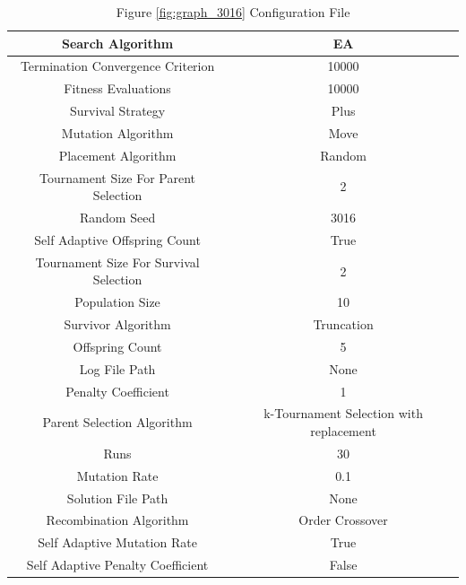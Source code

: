 \documentclass{standalone}
\begin{document}
\begin{table}[!htb]
	\centering
	\caption{Figure \ref{fig:graph_3016} Configuration File}
	\label{tab:graph_3016}
	\begin{tabular}{| c | c |}
		\hline
		Search Algorithm		& EA		 \\
		\hline
		Termination Convergence Criterion		& 10000		 \\
		\hline
		Fitness Evaluations		& 10000		 \\
		\hline
		Survival Strategy		& Plus		 \\
		\hline
		Mutation Algorithm		& Move		 \\
		\hline
		Placement Algorithm		& Random		 \\
		\hline
		Tournament Size For Parent Selection		& 2		 \\
		\hline
		Random Seed		& 3016		 \\
		\hline
		Self Adaptive Offspring Count		& True		 \\
		\hline
		Tournament Size For Survival Selection		& 2		 \\
		\hline
		Population Size		& 10		 \\
		\hline
		Survivor Algorithm		& Truncation		 \\
		\hline
		Offspring Count		& 5		 \\
		\hline
		Log File Path		& None		 \\
		\hline
		Penalty Coefficient		& 1		 \\
		\hline
		Parent Selection Algorithm		& k-Tournament Selection with replacement		 \\
		\hline
		Runs		& 30		 \\
		\hline
		Mutation Rate		& 0.1		 \\
		\hline
		Solution File Path		& None		 \\
		\hline
		Recombination Algorithm		& Order Crossover		 \\
		\hline
		Self Adaptive Mutation Rate		& True		 \\
		\hline
		Self Adaptive Penalty Coefficient		& False		 \\
		\hline
	\end{tabular}
\end{table}
\end{document}
